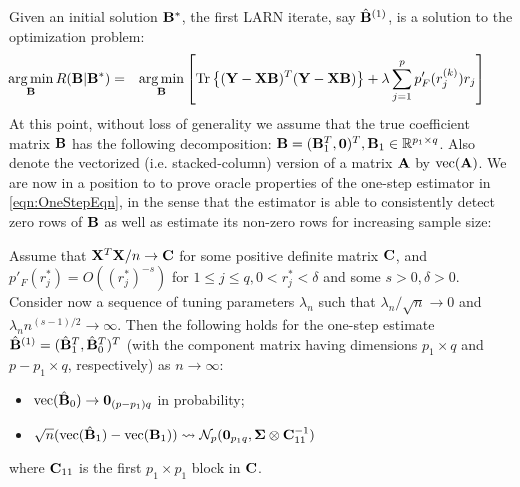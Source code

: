 Given an initial solution ${\mathbf{B}}^*$, the first LARN iterate, say $\hat{{\mathbf{B}}}^{(1)}$, is a solution to the optimization problem: 
%
\begin{eqnarray}\label{eqn:OneStepEqn}
\hspace{-2em} \argmin_\bfB R(\bfB|\bfB^*)  &=& \argmin_\bfB \left[ \Tr \left\{ (\bfY - \bfX\bfB)^T (\bfY - \bfX\bfB)\right\} + \lambda \sum_{j=1}^p  p'_F (r_j^{(k)}) r_j \right]
\end{eqnarray}
%
At this point, without loss of generality we assume that the true coefficient matrix ${\mathbf{B}}$ has the following decomposition: ${\mathbf{B}} = ({\mathbf{B}}^T_{1}, {\bf 0})^T, {\mathbf{B}}_1 \in \mathbb R^{p_1 \times q}$. Also denote the vectorized (i.e. stacked-column) version of a matrix ${\mathbf{A}}$ by $\text{vec}({\mathbf{A}})$. We are now in a position to to prove oracle properties of the one-step estimator in \ref{eqn:OneStepEqn}, in the sense that the estimator is able to consistently detect zero rows of ${\mathbf{B}}$ as well as estimate its non-zero rows for increasing sample size:
%
\begin{Theorem}\label{Thm:OracleThm}

Assume that ${\mathbf{X}}^T {\mathbf{X}}/n \rightarrow {\mathbf{C}}$ for some positive definite matrix ${\mathbf{C}}$, and $ p'_F(r_j^*) = O( (r_j^* )^{-s})$ for $1 \leq j \leq q, 0 < r_j^* < \delta$ and some $s>0, \delta > 0$. Consider now a sequence of tuning parameters $\lambda_n$ such that $\lambda_n / \sqrt n \rightarrow 0$ and $\lambda_n n^{(s-1)/2} \rightarrow \infty$. Then the following holds for the one-step estimate $\hat{{\mathbf{B}}}^{(1)} = (\hat{{\mathbf{B}}}^T_{1}, \hat{{\mathbf{B}}}^T_{0})^T$ (with the component matrix having dimensions $p_1 \times q$ and $p-p_1 \times q$, respectively) as $n \rightarrow \infty$:

\begin{itemize}
\item $\operatorname*{\text{vec}} (\hat{{\mathbf{B}}}_{0}) \rightarrow {\bf 0}_{(p-p_1)q}$ in probability;

\item $\sqrt n (\operatorname*{\text{vec}} (\hat{{\mathbf{B}}}_{1}) - \operatorname*{\text{vec}} ({\mathbf{B}}_{1})) \leadsto \mathcal N_p ( {\bf 0}_{p_1q}, {\boldsymbol{\Sigma}} \otimes {\mathbf{C}}_{11}^{-1})$
\end{itemize}
%
where ${\mathbf{C}}_{11}$ is the first $p_1 \times p_1$ block in ${\mathbf{C}}$.
\end{Theorem}


